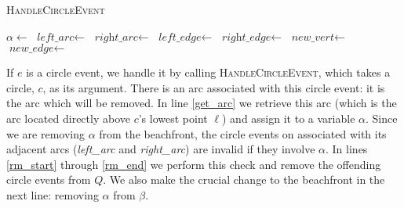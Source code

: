 \documentclass[12pt,twoside]{reedthesis}
\begin{document}
    \begin{algorithm}[H]
    \caption{\textsc{HandleCircleEvent}}\label{HandleCircleEvent}
    \begin{algorithmic}[1]
    \State $\alpha\gets$\label{get_arc}
    \State $\textit{left\_arc}\gets$
    \State $\textit{right\_arc}\gets$
    \State $\textit{left\_edge}\gets$ 
    \State $\textit{right\_edge}\gets$ 
    \label{rm_start}
      \State {}
    \EndIf
      \State {}
    \EndIf  \label{rm_end}
    \State {}
    \State $\textit{new\_vert}\gets$ \label{new_vert} 
    \State $\textit{new\_edge}\gets$ \label{new_edge}
    \State {} \label{set_src}
    \State {}\label{update_left} 
    \State {}\label{update_right}
    \State {}
    \State {} 
    \EndProcedure
    \end{algorithmic} 
    \end{algorithm}

    If $e$ is a circle event, we handle it by calling \textsc{HandleCircleEvent}, which takes a circle, $c$, as its argument. There is an arc associated with this circle event: it is the arc which will be removed. In line \ref{get_arc} we retrieve this arc (which is the arc located directly above $c$'s lowest point $\ell$) and assign it to a variable $\alpha$. Since we are removing $\alpha$ from the beachfront, the circle events on associated with its adjacent arcs (\textit{left\_arc} and \textit{right\_arc}) are invalid if they involve $\alpha$. In lines \ref{rm_start} through \ref{rm_end} we perform this check and remove the offending circle events from $Q$. We also make the crucial change to the beachfront in the next line: removing $\alpha$ from $\beta$.\par
\end{document}
